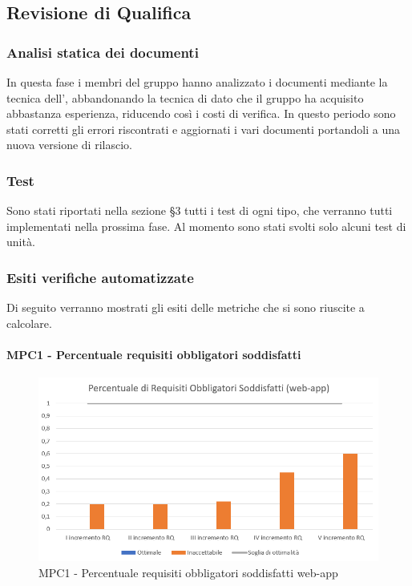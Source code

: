 \subsection{Revisione di Qualifica}
\subsubsection{Analisi statica dei documenti}
In questa fase i membri del gruppo \Gruppo{} hanno analizzato i documenti mediante la tecnica dell', abbandonando la tecnica di  dato che il gruppo ha acquisito abbastanza esperienza, riducendo così i costi di verifica. In questo periodo sono stati corretti gli errori riscontrati e aggiornati i vari documenti portandoli a una nuova versione di rilascio.
\subsubsection{Test}
Sono stati riportati nella sezione §3 tutti i test di ogni tipo, che verranno tutti implementati nella prossima fase. Al momento sono stati svolti solo alcuni test di unità.
\subsubsection{Esiti verifiche automatizzate}
Di seguito verranno mostrati gli esiti delle metriche che si sono riuscite a calcolare.

\paragraph{MPC1 - Percentuale requisiti obbligatori soddisfatti}
\begin{figure}[h!]
    \centering
      \includegraphics[scale=0.9]{Immagini/PercReqObbWA.PNG}
    \caption{MPC1 - Percentuale requisiti obbligatori soddisfatti web-app}
  \end{figure}

